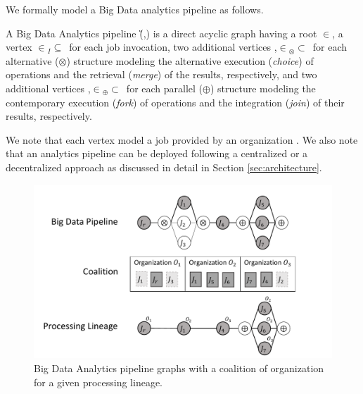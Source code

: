 We formally model a Big Data analytics pipeline as follows.

\begin{definition} \label{def:pipeline}
    A Big Data Analytics pipeline \G(\V,\E) is a direct acyclic graph having a root $\in$\V, a vertex $\in$\V$_I$$\subseteq$\V\ for each job  invocation, two additional vertices ,$\in$\V$_{\otimes}$$\subset$\V\ for each alternative ($\otimes$) structure modeling the alternative execution (\emph{choice}) of operations and the retrieval (\emph{merge}) of the results, respectively, and two additional vertices ,$\in$\V$_{\oplus}$$\subset$\V\ for each parallel ($\oplus$) structure modeling the contemporary execution (\emph{fork}) of operations and the integration (\emph{join}) of their results, respectively.
    \end{definition}

We note that each vertex  model a job  provided by an organization . We also note that an analytics pipeline can be deployed following a centralized or a decentralized approach as discussed in detail in Section \ref{sec:architecture}.

    \begin{figure}[!t]
        \includegraphics[width=0.98\columnwidth]{generaleFig1.pdf}
        \caption{Big Data Analytics pipeline graphs with a coalition of organization for a given processing lineage.}\label{fig:BDpipeline}
    \end{figure}
    
